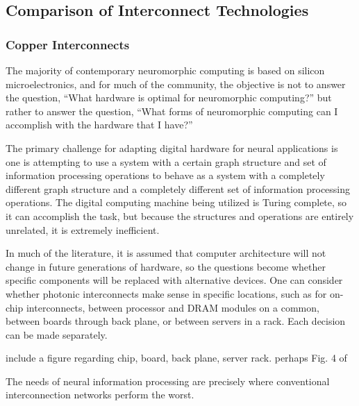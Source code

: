 \subsection{Comparison of Interconnect Technologies}

\subsubsection{Copper Interconnects}
The majority of contemporary neuromorphic computing is based on silicon microelectronics, and for much of the community, the objective is not to answer the question, ``What hardware is optimal for neuromorphic computing?'' but rather to answer the question, ``What forms of neuromorphic computing can I accomplish with the hardware that I have?'' 

\vspace{3em}
The primary challenge for adapting digital hardware for neural applications is one is attempting to use a system with a certain graph structure and set of information processing operations to behave as a system with a completely different graph structure and a completely different set of information processing operations. The digital computing machine being utilized is Turing complete, so it can accomplish the task, but because the structures and operations are entirely unrelated, it is extremely inefficient.

\vspace{3em}
In much of the literature, it is assumed that computer architecture will not change in future generations of hardware, so the questions become whether specific components will be replaced with alternative devices. One can consider whether photonic interconnects make sense in specific locations, such as for on-chip interconnects, between processor and DRAM modules on a common, between boards through back plane, or between servers in a rack. Each decision can be made separately. 

\vspace{3em}
include a figure regarding chip, board, back plane, server rack. perhaps Fig. 4 of \cite{husz2003}

\vspace{3em}
The needs of neural information processing are precisely where conventional interconnection networks perform the worst.

